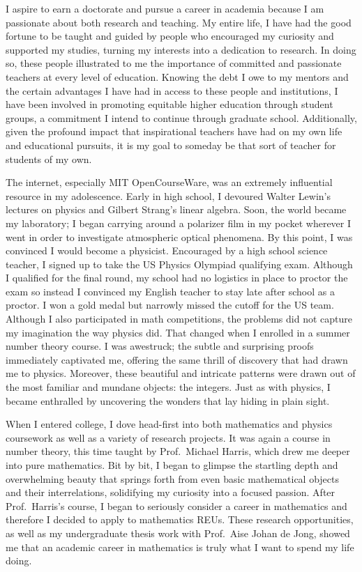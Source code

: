 \documentclass[11pt]{article}
\begin{document}
I aspire to earn a doctorate and pursue a career in academia because I am passionate about both research and teaching. My entire life, I have had the good fortune to be taught and guided by people who encouraged my curiosity and supported my studies, turning my interests into a dedication to research. In doing so, these people illustrated to me the importance of committed and passionate teachers at every level of education. Knowing the debt I owe to my mentors and the certain advantages I have had in access to these people and institutions, I have been involved in promoting equitable higher education through student groups, a commitment I intend to continue through graduate school. Additionally, given the profound impact that inspirational teachers have had on my own life and educational pursuits, it is my goal to someday be that sort of teacher for students of my own. 
\par
The internet, especially MIT OpenCourseWare, was an extremely influential resource in my adolescence. Early in high school, I devoured Walter Lewin’s lectures on physics and Gilbert Strang's linear algebra. Soon, the world became my laboratory; I began carrying around a polarizer film in my pocket wherever I went in order to investigate atmospheric optical phenomena. By this point, I was convinced I would become a physicist. Encouraged by a high school science teacher, I signed up to take the US Physics Olympiad qualifying exam. Although I qualified for the final round, my school had no logistics in place to proctor the exam so instead I convinced my English teacher to stay late after school as a proctor. I won a gold medal but narrowly missed the cutoff for the US team. Although I also participated in math competitions, the problems did not capture my imagination the way physics did. That changed when I enrolled in a summer number theory course. I was awestruck; the subtle and surprising proofs immediately captivated me, offering the same thrill of discovery that had drawn me to physics. Moreover, these beautiful and intricate patterns were drawn out of the most familiar and mundane objects: the integers. Just as with physics, I became enthralled by uncovering the wonders that lay hiding in plain sight.
\par
When I entered college, I dove head-first into both mathematics and physics coursework as well as a variety of research projects. It was again a course in number theory, this time taught by Prof.\ Michael Harris, which drew me deeper into pure mathematics. Bit by bit, I began to glimpse the startling depth and overwhelming beauty that springs forth from even basic mathematical objects and their interrelations, solidifying my curiosity into a focused passion. After Prof.\ Harris’s course, I began to seriously consider a career in mathematics and therefore I decided to apply to mathematics REUs. These research opportunities, as well as my undergraduate thesis work with Prof.\ Aise Johan de Jong, showed me that an academic career in mathematics is truly what I want to spend my life doing.
\end{document}
